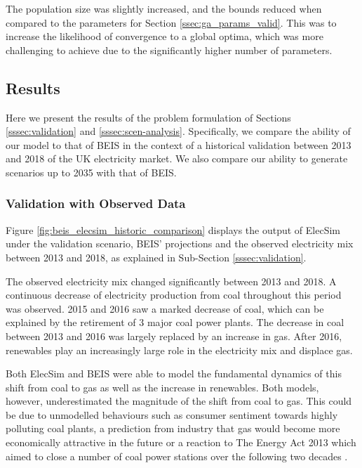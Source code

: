 The population size was slightly increased, and the bounds reduced when compared to the parameters for Section \ref{ssec:ga_params_valid}. This was to increase the likelihood of convergence to a global optima, which was more challenging to achieve due to the significantly higher number of parameters.


\subsection{Results}
\label{sec:results}

Here we present the results of the problem formulation of Sections \ref{sssec:validation} and  \ref{sssec:scen-analysis}. Specifically, we compare the ability of our model to that of BEIS in the context of a historical validation between 2013 and 2018 of the UK electricity market. We also compare our ability to generate scenarios up to 2035 with that of BEIS. 

\subsubsection{Validation with Observed Data}

Figure \ref{fig:beis_elecsim_historic_comparison} displays the output of ElecSim under the validation scenario, BEIS' projections and the observed electricity mix between 2013 and 2018, as explained in Sub-Section \ref{sssec:validation}.

The observed electricity mix changed significantly between 2013 and 2018. A continuous decrease of electricity production from coal throughout this period was observed. 2015 and 2016 saw a marked decrease of coal, which can be explained by the retirement of 3 major coal power plants. The decrease in coal between 2013 and 2016 was largely replaced by an increase in gas. After 2016, renewables play an increasingly large role in the electricity mix and displace gas.

Both ElecSim and BEIS were able to model the fundamental dynamics of this shift from coal to gas as well as the increase in renewables. Both models, however, underestimated the magnitude of the shift from coal to gas. This could be due to unmodelled behaviours such as consumer sentiment towards highly polluting coal plants, a prediction from industry that gas would become more economically attractive in the future or a reaction to The Energy Act 2013 which aimed to close a number of coal power stations over the following two decades \cite{uk_energy_act}.

